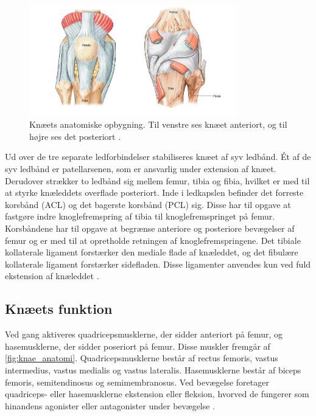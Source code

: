 \begin{figure}[H]
\centering
\includegraphics[width=0.8\textwidth]{figures/knae_anatomi}
\caption{Knæets anatomiske opbygning. Til venstre ses knæet anteriort, og til højre ses det posteriort \citep{martini2012}.}
\label{fig:knae_anatomi}
\end{figure} 

\noindent
Ud over de tre separate ledforbindelser stabiliseres knæet af syv ledbånd. Ét af de syv ledbånd er patellarsenen, som er ansvarlig under extension af knæet. Derudover strækker to ledbånd sig mellem femur, tibia og fibia, hvilket er med til at styrke knæleddets overflade posteriort. 
Inde i ledkapslen befinder det forreste korsbånd (ACL) og det bagerste korsbånd (PCL) sig. Disse har til opgave at fastgøre indre knoglefremspring af tibia til knoglefremspringet på femur. 
Korsbåndene har til opgave at begrænse anteriore og posteriore bevægelser af femur og er med til at opretholde retningen af knoglefremspringene. 
Det tibiale kollaterale ligament forstærker den mediale flade af knæleddet, og det fibulære kollaterale ligament forstærker sidefladen. Disse ligamenter anvendes kun ved fuld ekstension af knæleddet \citep{martini2012}.

\subsection{Knæets funktion}
Ved gang aktiveres quadricepsmusklerne, der sidder anteriort på femur, og hasemusklerne, der sidder poseriort på femur. Disse muskler fremgår af \autoref{fig:knae_anatomi}. Quadricepsmusklerne består af rectus femoris, vastus intermedius, vastus medialis og vastus lateralis. 
Hasemusklerne består af biceps femoris, semitendinosus og semimembranosus. 
Ved bevægelse foretager quadriceps- eller hasemusklerne ekstension eller fleksion, hvorved de fungerer som hinandens agonister eller antagonister under bevægelse \citep{martini2012}. 

